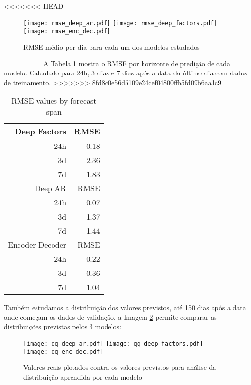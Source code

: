 

<<<<<<< HEAD
\begin{figure}[H]
\centering
\texttt{[image: rmse\_deep\_ar.pdf]} \hfill
\texttt{[image: rmse\_deep\_factors.pdf]} \hfill
\texttt{[image: rmse\_enc\_dec.pdf]} 
\caption{RMSE médio por dia para cada um dos modelos estudados} 
\label{fig:rmseday}
\end{figure}
=======
A Tabela \ref{tab:rmse} mostra o RMSE por horizonte de predição de cada modelo.
Calculado para 24h, 3 dias e 7 dias após a data do último dia com dados de treinamento.
>>>>>>> 8fd8c0e56d5109e24cef04800ffb5fd09b6aa1c9


\begin{center}
\begin{table}[htbp]
\caption{\label{tab:rmse}
RMSE values by forecast span}
\centering
\begin{tabular}{rr}
\hline
Deep Factors & RMSE\\
\hline
24h & 0.18\\
3d & 2.36\\
7d & 1.83\\
\hline
Deep AR & RMSE\\
\hline
24h & 0.07\\
3d & 1.37\\
7d & 1.44\\
\hline
Encoder Decoder & RMSE\\
\hline
24h & 0.22\\
3d & 0.36\\
7d & 1.04\\
\end{tabular}
\end{table}
\end{center}


Também estudamos a distribuição dos valores previstos, até 150 dias após a data onde começam os dados de validação, a Imagem \ref{fig:distr} permite comparar as distribuições previstas pelos 3 modelos:

\begin{figure}[H]
\label{fig:distr}
\centering
\texttt{[image: qq\_deep\_ar.pdf]} \hfill
\texttt{[image: qq\_deep\_factors.pdf]} \hfill
\texttt{[image: qq\_enc\_dec.pdf]} 
\caption{Valores reais plotados contra os valores previstos para análise da distribuição aprendida por cada modelo} 
\end{figure}


